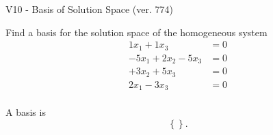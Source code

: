 \begin{exercise}
  \begin{exerciseTitle}V10 - Basis of Solution Space (ver. 774)\end{exerciseTitle}
  \begin{exerciseStatement}
    Find a basis for the solution space of the homogeneous system 
\begin{align*}
 1 x_ 1 + 1 x_ 3 &= 0  \\ 
  -5 x_ 1 + 2 x_ 2 -5 x_ 3 &= 0  \\ 
  + 3 x_ 2 + 5 x_ 3 &= 0  \\ 
  2 x_ 1 -3 x_ 3 &= 0  \\ 
 \end{align*}


 
  \end{exerciseStatement}

  \begin{exerciseAnswer}
   A basis is   
\[\left\{\right\}.\]

  


  \end{exerciseAnswer}
\end{exercise}